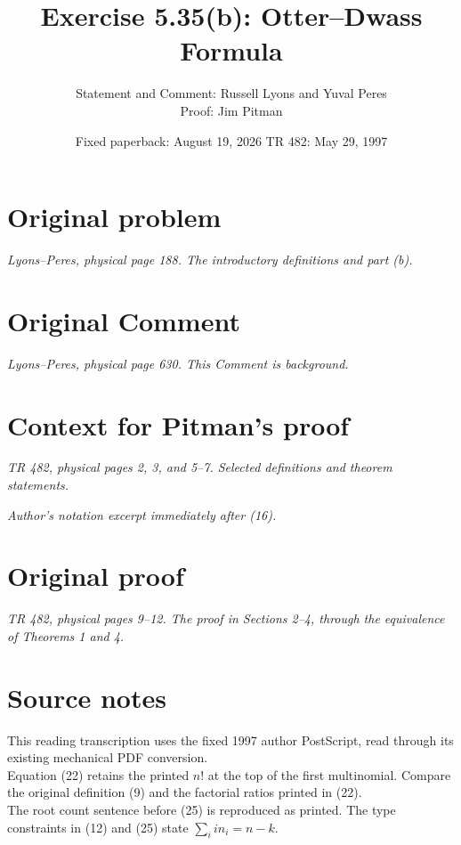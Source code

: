 \documentclass[11pt,a4paper]{article}
\title{Exercise 5.35(b): Otter--Dwass Formula}
\author{Statement and Comment: Russell Lyons and Yuval Peres\\Proof: Jim Pitman}
\date{Fixed paperback: August 19, 2026 \qquad TR 482: May 29, 1997}
\begin{document}
\maketitle
\section*{Original problem}
\noindent\emph{Lyons--Peres, physical page 188. The introductory definitions and part (b).}\par\medskip

\section*{Original Comment}
\noindent\emph{Lyons--Peres, physical page 630. This Comment is background.}\par\medskip

\clearpage
\section*{Context for Pitman's proof}
\noindent\emph{TR 482, physical pages 2, 3, and 5--7. Selected definitions and theorem statements.}\par\medskip

\medskip
\noindent\emph{Author's notation excerpt immediately after (16).}\par\smallskip

\clearpage
\section*{Original proof}
\noindent\emph{TR 482, physical pages 9--12. The proof in Sections 2--4, through the equivalence of Theorems 1 and 4.}\par\medskip

\section*{Source notes}
\noindent This reading transcription uses the fixed 1997 author PostScript, read through its existing mechanical PDF conversion.\\[3pt]
\noindent Equation (22) retains the printed $n!$ at the top of the first multinomial. Compare the original definition (9) and the factorial ratios printed in (22).\\[3pt]
\noindent The root count sentence before (25) is reproduced as printed. The type constraints in (12) and (25) state $\sum_i i n_i=n-k$.
\end{document}
